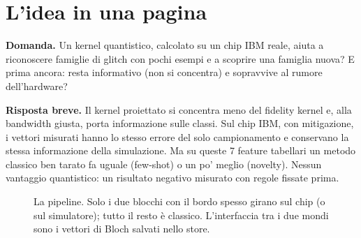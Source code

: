 \section{L’idea in una pagina}

\textbf{Domanda.} Un kernel quantistico, calcolato su un chip IBM reale, aiuta a riconoscere famiglie di glitch con
pochi esempi e a scoprire una famiglia nuova? E prima ancora: resta informativo (non si concentra) e sopravvive al
rumore dell’hardware?

\textbf{Risposta breve.} Il kernel proiettato si concentra meno del fidelity kernel e, alla bandwidth giusta, porta
informazione sulle classi. Sul chip IBM, con mitigazione, i vettori misurati hanno lo stesso errore del solo
campionamento e conservano la stessa informazione della simulazione. Ma su queste 7 feature tabellari un metodo
classico ben tarato fa uguale (few-shot) o un po’ meglio (novelty). Nessun vantaggio quantistico: un risultato
negativo misurato con regole fissate prima.

\begin{figure}[H]
\centering
{}
\caption{La pipeline. Solo i due blocchi con il bordo spesso girano sul chip (o sul simulatore); tutto il resto è
classico. L’interfaccia tra i due mondi sono i vettori di Bloch salvati nello store.}
\label{fig:pipeline}
\end{figure}


